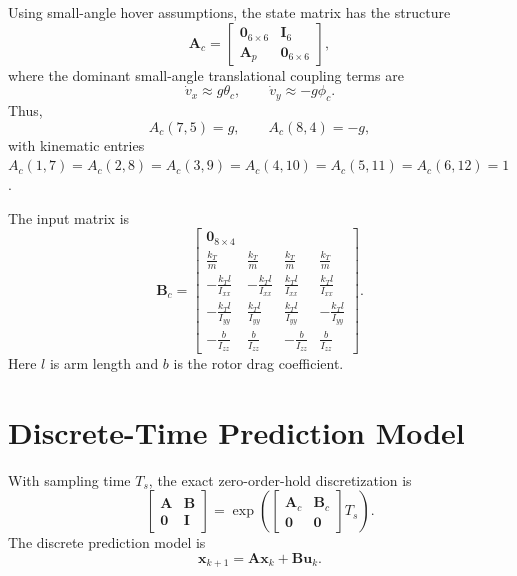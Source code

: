 \documentclass[12pt,a4paper]{article}
\begin{document}
Using small-angle hover assumptions, the state matrix has the structure
\begin{equation}
\bm{A}_c =
\begin{bmatrix}
\bm{0}_{6\times 6} & \bm{I}_{6}\\
\bm{A}_{p} & \bm{0}_{6\times 6}
\end{bmatrix},
\end{equation}
where the dominant small-angle translational coupling terms are
\begin{equation}
\dot{v}_x \approx g\theta_c,\qquad
\dot{v}_y \approx -g\phi_c.
\end{equation}
Thus,
\begin{equation}
A_c(7,5)=g,\qquad A_c(8,4)=-g,
\end{equation}
with kinematic entries $A_c(1,7)=A_c(2,8)=A_c(3,9)=A_c(4,10)=A_c(5,11)=A_c(6,12)=1$.

The input matrix is
\begin{equation}
\bm{B}_c =
\begin{bmatrix}
\bm{0}_{8\times 4}\\
\frac{k_T}{m} & \frac{k_T}{m} & \frac{k_T}{m} & \frac{k_T}{m}\\
-\frac{k_Tl}{I_{xx}} & -\frac{k_Tl}{I_{xx}} & \frac{k_Tl}{I_{xx}} & \frac{k_Tl}{I_{xx}}\\
-\frac{k_Tl}{I_{yy}} & \frac{k_Tl}{I_{yy}} & \frac{k_Tl}{I_{yy}} & -\frac{k_Tl}{I_{yy}}\\
-\frac{b}{I_{zz}} & \frac{b}{I_{zz}} & -\frac{b}{I_{zz}} & \frac{b}{I_{zz}}
\end{bmatrix}.
\label{eq:input_matrix}
\end{equation}
Here $l$ is arm length and $b$ is the rotor drag coefficient.

\section{Discrete-Time Prediction Model}

With sampling time $T_s$, the exact zero-order-hold discretization is
\begin{equation}
\begin{bmatrix}
\bm{A} & \bm{B}\\
\bm{0} & \bm{I}
\end{bmatrix}
=
\exp\left(
\begin{bmatrix}
\bm{A}_c & \bm{B}_c\\
\bm{0} & \bm{0}
\end{bmatrix}T_s
\right).
\end{equation}
The discrete prediction model is
\begin{equation}
\bm{x}_{k+1}=\bm{A}\bm{x}_{k}+\bm{B}\bm{u}_{k}.
\label{eq:discrete_model}
\end{equation}
\end{document}
